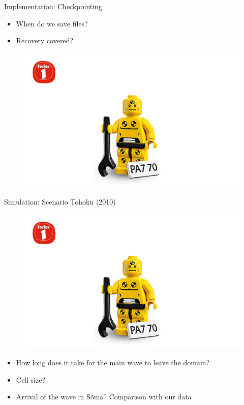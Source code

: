 \documentclass[shortpres]{beamer}
\newcommand{\imgfullscale}{0.75}
\begin{document}
\begin{frame}{Implementation: Checkpointing}
	\begin{multicols}{2}
		\begin{itemize}
			\item When do we save files?
			\item Recovery covered?
		\end{itemize}
		
	\columnbreak
	
		\begin{figure}
			\includegraphics[width=\imgfullscale\linewidth]{img/dummy_image.jpg}
		\end{figure}
	\end{multicols}	
\end{frame}

\begin{frame}{Simulation: Scenario Tohoku (2010)}
	\begin{figure}
		\includegraphics[width=\imgfullscale\linewidth]{img/dummy_image.jpg}
	\end{figure}
	\begin{itemize}
		\item How long does it take for the main wave to leave the domain?
		\item Cell size?
		\item Arrival of the wave in Sõma? Comparison with our data
	\end{itemize}
\end{frame}
\end{document}
